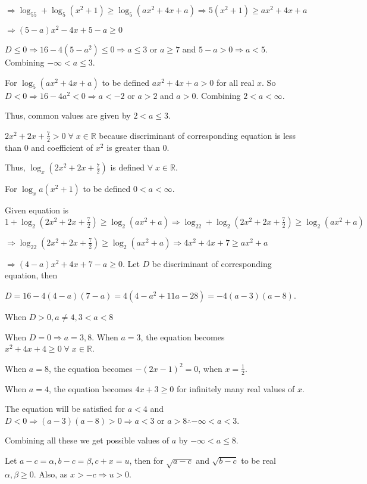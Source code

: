   $\Rightarrow \log_55 + \log_5(x^2 + 1) \geq \log_5(ax^2 + 4x + a) \Rightarrow 5(x^2 + 1)\geq ax^2 + 4x +
  a$

  $\Rightarrow (5 - a)x^2 - 4x + 5 - a \geq 0$

  $D\leq 0 \Rightarrow 16 - 4(5 - a^2)\leq 0\Rightarrow a\leq 3$ or $a\geq 7$ and $5 - a > 0\Rightarrow a <
  5$. Combining $-\infty < a\leq 3$.

  For $\log_5(ax^2 + 4x + a)$ to be defined $ax^2 + 4x + a > 0$ for all real $x$. So $D < 0 \Rightarrow 16 -
  4a^2 < 0 \Rightarrow a < -2$ or $a > 2$ and $a > 0$. Combining $2 < a < \infty$.

  Thus, common values are given by $2 < a \leq 3$.
\item $2x^2 + 2x + \frac{7}{2} > 0\;\forall\;x\in\mathbb{R}$ because discriminant of corresponding equation
  is less than $0$ and coefficient of $x^2$ is greater than $0$.

  Thus, $\log_x\left(2x^2 + 2x + \frac{7}{2}\right)$ is defined $\forall\;x\in\mathbb{R}$.

  For $\log_xa(x^2 + 1)$ to be defined $0 < a < \infty$.

  Given equation is $1 + \log_2\left(2x^2 + 2x + \frac{7}{2}\right)\geq \log_2(ax^2 + a) \Rightarrow \log_22
  + \log_2\left(2x^2 + 2x + \frac{7}{2}\right)\geq \log_2(ax^2 + a)$

  $\Rightarrow \log_22\left(2x^2 + 2x + \frac{7}{2}\right)\geq \log_2(ax^2 + a)\Rightarrow 4x^2 + 4x + 7\geq
  ax^2 + a$

  $\Rightarrow (4 - a)x^2 + 4x + 7 - a\geq 0$. Let $D$ be discriminant of corresponding equation, then

  $D = 16 - 4(4 - a)(7 - a) = 4(4 - a^2 + 11a - 28) = -4(a - 3)(a - 8)$.

  When $D > 0, a\neq 4, 3 < a < 8$

  When $D= 0\Rightarrow a = 3, 8$. When $a = 3$, the equation becomes $x^2+ 4x + 4\geq
  0\;\forall\;x\in\mathbb{R}$.

  When $a = 8$, the equation becomes $-(2x - 1)^2 = 0$, when $x = \frac{1}{2}$.

  When $a = 4$, the equation becomes $4x + 3\geq 0$ for infinitely many real values of $x$.

  The equation will be satisfied for $a < 4$ and $D < 0 \Rightarrow (a - 3)(a - 8) > 0\Rightarrow a < 3$ or
  $a > 8 \therefore -\infty < a < 3$.

  Combining all these we get possible values of $a$ by $-\infty < a \leq 8$.
\item Let $a - c = \alpha, b - c = \beta, c + x = u$, then for $\sqrt{a - c}$ and $\sqrt{b - c}$ to be real
  $\alpha,\beta\geq 0$. Also, as $x > -c\Rightarrow u > 0$.


